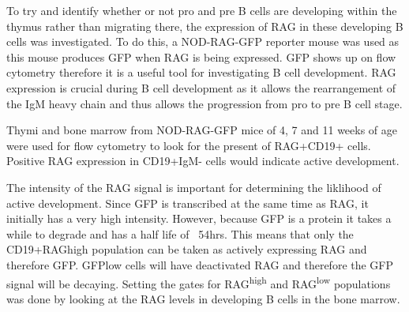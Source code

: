 To try and identify whether or not pro and pre B cells are developing within the thymus rather than migrating there, the expression of RAG in these developing B cells was investigated.
To do this, a NOD-RAG-GFP reporter mouse was used as this mouse produces GFP when RAG is being expressed.
GFP shows up on flow cytometry therefore it is a useful tool for investigating B cell development.
RAG expression is crucial during B cell development as it allows the rearrangement of the IgM heavy chain and thus allows the progression from pro to pre B cell stage.

Thymi and bone marrow from NOD-RAG-GFP mice of 4, 7 and 11 weeks of age were used for flow cytometry to look for the present of RAG+CD19+ cells.
Positive RAG expression in CD19+IgM- cells would indicate active development.

The intensity of the RAG signal is important for determining the liklihood of active development.
Since GFP is transcribed at the same time as RAG, it initially has a very high intensity.
However, because GFP is a protein it takes a while to degrade and has a half life of ~54hrs.
This means that only the CD19+RAGhigh population can be taken as actively expressing RAG and therefore GFP.
GFPlow cells will have deactivated RAG and therefore the GFP signal will be decaying.
Setting the gates for RAG\textsuperscript{high} and RAG\textsuperscript{low} populations was done by looking at the RAG levels in developing B cells in the bone marrow.


